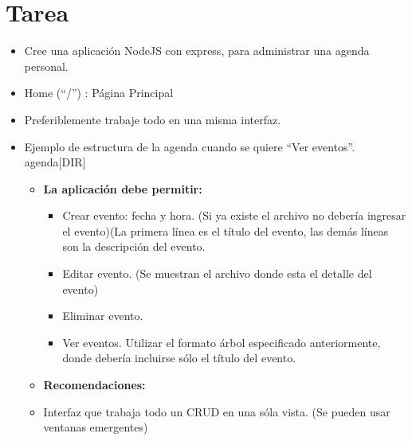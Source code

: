 \documentclass{article}
\begin{document}
	\section{Tarea}
	\begin{itemize}		
		\item Cree una aplicación NodeJS con express, para administrar una agenda personal.
        \item Home (“/”) : Página Principal
        \item Preferiblemente trabaje todo en una misma interfaz. 
        \item Ejemplo de estructura de la agenda cuando se quiere “Ver eventos”.
agenda[DIR]
        \begin{itemize}
        \begin{lstlisting}[style=ascii-tree]
|------------- 2023-05-15 [DIR]
|		|-------------- 10-00.txt [FILE]
|		|-------------- 13-30.txt [FILE]
|------------- 2023-05-20 [DIR]
	|-------------- 09-10.txt [FILE]
	|-------------- 20-40.txt [FILE]
\end{lstlisting}
        \item \textbf{La aplicación debe permitir:}
		\begin{itemize}
		    \item Crear evento: fecha y hora. (Si ya existe el archivo no debería ingresar el evento)(La primera línea es el título del evento, las demás líneas son la descripción del evento.
            \item Editar evento. (Se muestran el archivo  donde esta el detalle del evento)
            \item Eliminar evento.
            \item Ver eventos. Utilizar el formato árbol especificado anteriormente, donde debería incluirse sólo el título del evento.
		\end{itemize}
		\item \textbf{Recomendaciones:}
        \item Interfaz que trabaja todo un CRUD en una sóla vista. (Se pueden usar ventanas emergentes)
        \end{itemize}

\end{itemize}
\end{document}
